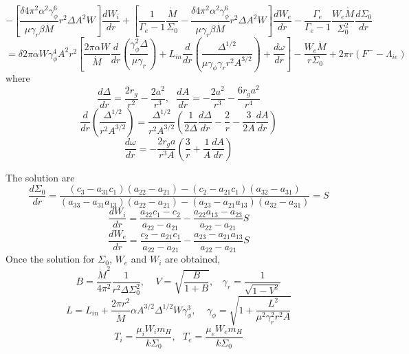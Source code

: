 \documentclass[12pt]{book}
\begin{document}
\begin{equation}\nonumber
-\left[\frac{\delta4\pi^2\alpha^2\gamma_\phi^6}{\mu\gamma_r\beta\dot M}r^2\Delta A^2W\right]\frac{dW_i}{dr}+
\left[\frac{1}{\Gamma_e-1}\frac{\dot M}{\Sigma_0}
-\frac{\delta4\pi^2\alpha^2\gamma_\phi^6}{\mu\gamma_r\beta\dot M}r^2\Delta A^2W\right]\frac{dW_e}{dr}
-\frac{\Gamma_e}{\Gamma_e-1}\frac{W_e\dot M}{\Sigma_0^2}\frac{d\Sigma_0}{dr}
\end{equation}
\begin{equation}
=\delta2\pi\alpha W\gamma_\phi^4A^2r^2
\left[\frac{2\pi\alpha W}{\dot M}\frac{d}{dr}\left(\frac{\gamma_\phi^2\Delta}{\mu\gamma_r}\right)
+L_{in}\frac{d}{dr}\left(\frac{\Delta^{1/2}}{\mu\gamma_\phi\gamma_r r^2A^{3/2}}\right)
+\frac{d\omega}{dr}
\right]
-\frac{W_e\dot M}{r\Sigma_0}+2\pi r (F^--\Lambda_{ie})
\end{equation}
where
\begin{equation}
 \frac{d\Delta}{dr}=\frac{2r_g}{r^2}-\frac{2a^2}{r^3},
~~~\frac{dA}{dr}=-\frac{2a^2}{r^3}-\frac{6r_ga^2}{r^4}
\end{equation}
\begin{equation}
 \frac{d}{dr}\left(\frac{\Delta^{1/2}}{r^2A^{3/2}}\right)=
\frac{\Delta^{1/2}}{r^2A^{3/2}}
\left(\frac{1}{2\Delta}\frac{d\Delta}{dr}-\frac{2}{r}-\frac{3}{2A}\frac{dA}{dr}\right)
\end{equation}
\begin{equation}
 \frac{d\omega}{dr}=-\frac{2r_ga}{r^3A}\left(\frac{3}{r}+\frac{1}{A}\frac{dA}{dr}\right)
\end{equation}

The solution are
\begin{equation}
 \frac{d\Sigma_0}{dr}=\frac{(c_3-a_{31}c_1)(a_{22}-a_{21})-(c_2-a_{21}c_{1})(a_{32}-a_{31})}
{(a_{33}-a_{31}a_{13})(a_{22}-a_{21})-(a_{23}-a_{21}a_{13})(a_{32}-a_{31})}=S
\end{equation}
\begin{equation}
 \frac{dW_i}{dr}=\frac{a_{22}c_1-c_2}{a_{22}-a_{21}}
-\frac{a_{22}a_{13}-a_{23}}{a_{22}-a_{21}}S
\end{equation}
\begin{equation}
\frac{dW_e}{dr}=\frac{c_2-a_{21}c_1}{a_{22}-a_{21}}-\frac{a_{23}-a_{21}a_{13}}{a_{22}-a_{21}}S
\end{equation}
Once the solution for $\Sigma_0$, $W_e$ and $W_i$ are obtained, 
\begin{equation}
 B=\frac{\dot M^2}{4\pi^2}\frac{1}{r^2\Delta\Sigma_0^2},~~~~~V=\sqrt{\frac{B}{1+B}},~~~~
\gamma_r=\frac{1}{\sqrt{1-V^2}}
\end{equation}
\begin{equation}
 L=L_{in}+\frac{2\pi r^2}{\dot M}\alpha A^{3/2}\Delta^{1/2}W\gamma_\phi^3,~~~~~
\gamma_\phi=\sqrt{1+\frac{L^2}{\mu^2\gamma_r^2r^2A}}
\end{equation}
%
\begin{equation}
T_i=\frac{\mu_iW_im_{H}}{k\Sigma_0},~~~T_e=\frac{\mu_eW_em_{H}}{k\Sigma_0}
\end{equation}
%
%
\end{document}
